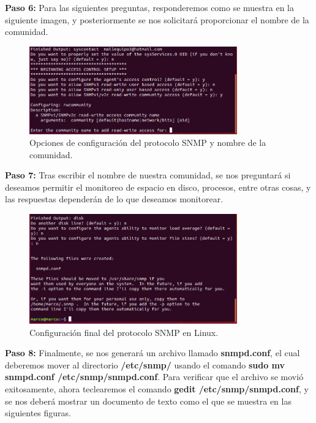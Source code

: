 \pagebreak
\noindent
\newline
\textbf{Paso 6:} Para las siguientes preguntas, responderemos como se muestra en la siguiente imagen, y posteriormente se nos solicitará proporcionar el nombre de la comunidad.

\begin{figure}[htbp!]
	\centering
		\includegraphics[width=0.8\textwidth]{images/desarrollo/configuracion_linux6.png}
	\caption{Opciones de configuración del protocolo SNMP y nombre de la comunidad.}
\end{figure}

\noindent
\newline
\textbf{Paso 7:} Tras escribir el nombre de nuestra comunidad, se nos preguntará si deseamos permitir el monitoreo de espacio en disco, procesos, entre otras cosas, y las respuestas dependerán de lo que deseamos monitorear. 

\begin{figure}[htbp!]
	\centering
		\includegraphics[width=0.8\textwidth]{images/desarrollo/configuracion_linux7.png}
	\caption{Configuración final del protocolo SNMP en Linux.}
\end{figure}

\pagebreak
\noindent
\newline
\textbf{Paso 8:} Finalmente, se nos generará un archivo llamado \textbf{snmpd.conf}, el cual deberemos mover al directorio \textbf{/etc/snmp/} usando el comando \textbf{sudo mv snmpd.conf /etc/snmp/snmpd.conf}.
Para verificar que el archivo se movió exitosamente, ahora teclearemos el comando \textbf{gedit /etc/snmp/snmpd.conf}, y se nos deberá mostrar un documento de texto como el que se muestra en las siguientes figuras.

